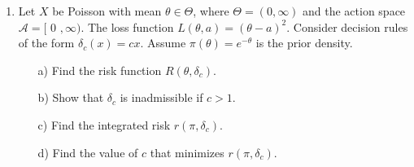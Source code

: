\documentclass[12pt]{article}
\def\t{\theta}
\begin{document}
\begin{enumerate}
\item Let $X$ be Poisson with mean $\theta \in \Theta$, where $\Theta = (0,\infty)$ and the action space $\mathcal{A}= [$ 0 $, \infty)$. The loss function $L(\theta,a) = (\theta-a)^2$. Consider decision rules of the form $\delta_c(x) = cx$. Assume $\pi(\theta)=e^{-\theta}$ is the prior density.
\begin{itemize}
\item[a)] Find the risk function $R(\theta, \delta_c)$.
\item[b)] Show that $\delta_c$ is inadmissible if $c>1$.
\item[c)] Find the integrated risk $r(\pi,\delta_c)$.
\item[d)] Find the value of $c$ that minimizes $r(\pi,\delta_c)$.
\end{itemize}








\end{enumerate}
\end{document}
